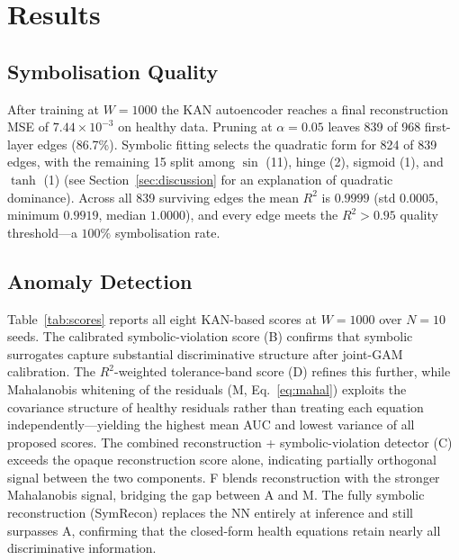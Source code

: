 \documentclass[conference]{IEEEtran}
\begin{document}
\section{Results}
\label{sec:results}

\subsection{Symbolisation Quality}
After training at $W{=}1000$ the KAN autoencoder reaches a
final reconstruction MSE of $7.44\times 10^{-3}$ on healthy
data. Pruning at $\alpha=0.05$ leaves 839 of 968 first-layer
edges (86.7\%). Symbolic fitting selects the quadratic form for
824 of 839 edges, with the remaining 15 split among $\sin$ (11),
hinge (2), sigmoid (1), and $\tanh$ (1) (see Section~\ref{sec:discussion} for an explanation of quadratic dominance). Across all 839 surviving
edges the mean $R^2$ is $0.9999$ (std $0.0005$, minimum $0.9919$,
median $1.0000$), and every edge meets the $R^2{>}0.95$ quality
threshold---a $100\%$ symbolisation rate.

\subsection{Anomaly Detection}
Table~\ref{tab:scores} reports all eight KAN-based scores at
$W{=}1000$ over $N{=}10$ seeds.
The calibrated symbolic-violation score (B) confirms that symbolic
surrogates capture substantial discriminative structure after joint-GAM
calibration. The $R^2$-weighted tolerance-band score (D) refines
this further, while Mahalanobis whitening of the residuals (M,
Eq.~\ref{eq:mahal}) exploits the covariance structure of healthy
residuals rather than treating each equation independently---yielding
the highest mean AUC and lowest variance of all proposed scores.
The combined reconstruction + symbolic-violation detector (C)
exceeds the opaque reconstruction score alone, indicating partially
orthogonal signal between the two components. F blends
reconstruction with the stronger Mahalanobis signal, bridging the gap between A and M.
The fully symbolic reconstruction (SymRecon) replaces the NN entirely at inference and still surpasses A, confirming that the closed-form health
equations retain nearly all discriminative information.
\end{document}
